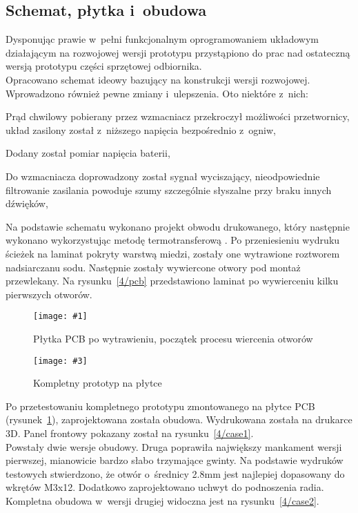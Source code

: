 \documentclass[polish]{aghengthesis}
\let\tempone\itemize
\let\temptwo\enditemize
\renewenvironment{itemize}{\tempone\setlength{\itemsep}{0cm}}{\temptwo}
\newcommand{\imgintss}[5]{
	\begin{figure}[{#5}]
		\centering
		\begin{minipage}{.45\textwidth}
			\centering
			\texttt{[image: \#1]}
			\caption{#2}
			\label{#1}
		\end{minipage}%
		\hfill
		\begin{minipage}{.45\textwidth}
			\centering
			\texttt{[image: \#3]}
			\caption{#4}
			\label{#3}
		\end{minipage}
	\end{figure}
}
\newcommand{\imghss}[4]{\imgintss{#1}{#2}{#3}{#4}{H}}
\begin{document}
		\subsection{Schemat, płytka i~obudowa}
			Dysponując prawie w~pełni funkcjonalnym oprogramowaniem układowym działającym na rozwojowej wersji prototypu przystąpiono do prac nad ostateczną wersją prototypu części sprzętowej odbiornika.
			$ $\\
			
			Opracowano schemat ideowy bazujący na konstrukcji wersji rozwojowej. Wprowadzono również pewne  zmiany i~ulepszenia. Oto niektóre z~nich:
			\begin{itemize}
				\item Prąd chwilowy pobierany przez wzmacniacz przekroczył możliwości przetwornicy, układ zasilony został z~niższego napięcia bezpośrednio z~ogniw,
				\item Dodany został pomiar napięcia baterii,
				\item Do wzmacniacza doprowadzony został sygnał wyciszający, nieodpowiednie filtrowanie zasilania powoduje szumy szczególnie słyszalne przy braku innych dźwięków,
			\end{itemize}
			
			Na podstawie schematu wykonano projekt obwodu drukowanego, który następnie wykonano wykorzystując metodę termotransferową \cite{ch4_pcb_method}.
			Po przeniesieniu wydruku ścieżek na laminat pokryty warstwą miedzi, zostały one wytrawione roztworem nadsiarczanu sodu. Następnie zostały wywiercone otwory pod montaż przewlekany. Na rysunku~\ref{4/pcb} przedstawiono laminat po wywierceniu kilku pierwszych otworów.
			$ $\\

			\imghss{4/pcb}{Płytka PCB po wytrawieniu, początek procesu wiercenia otworów}{4/prototype_3}{Kompletny prototyp na płytce}
			
			Po przetestowaniu kompletnego prototypu zmontowanego na płytce PCB (rysunek~\ref{4/prototype_3}), zaprojektowana została obudowa. Wydrukowana została na drukarce 3D. Panel frontowy pokazany został na rysunku~\ref{4/case1}.
			$ $\\
			
			Powstały dwie wersje obudowy. Druga poprawiła największy mankament wersji pierwszej, mianowicie bardzo słabo trzymające gwinty. Na podstawie wydruków testowych stwierdzono, że otwór o~średnicy 2.8mm jest najlepiej dopasowany do wkrętów M3x12. Dodatkowo zaprojektowano uchwyt do podnoszenia radia. Kompletna obudowa w~wersji drugiej widoczna jest na rysunku~\ref{4/case2}.
			
\end{document}
